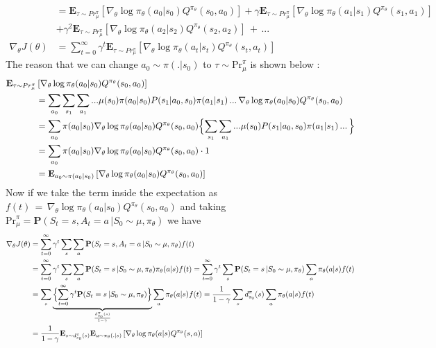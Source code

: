 {{\begin{align}
    & =\mathbf{E}_{\tau \sim Pr_\mu^\pi }\left[\nabla_\theta \log \pi_\theta(a_0|s_0)Q^{\pi_\theta}(s_0,a_0) \right] + \gamma \mathbf{E}_{\tau \sim Pr_\mu^\pi}\left[\nabla_\theta \log \pi_\theta(a_1|s_1)Q^{\pi_\theta}(s_1,a_1)\right] \nonumber \\&+ \gamma^2 \mathbf{E}_{\tau \sim Pr_\mu^\pi }\left[\nabla_\theta \log \pi_\theta(a_2|s_2)Q^{\pi_\theta}(s_2,a_2) \right]\,  + \, ... \nonumber\\
    \nabla_\theta J(\theta) &= \sum_{t=0}^{\infty} \gamma^t \mathbf{E}_{\tau \sim Pr_\mu^\pi }\left[\nabla_\theta \log \pi_\theta(a_t|s_t)Q^{\pi_\theta}(s_t,a_t) \right] \nonumber 
\end{align}
The reason that we can change $a_0 \sim \pi(.|s_0)$ to $\tau \sim \text{Pr}_{\mu}^{\pi}$ is shown below :
\begin{align}
    \mathbf{E}_{\tau \sim Pr_\mu^\pi } &\left[\nabla_\theta \log \pi_\theta(a_0|s_0)Q^{\pi_\theta}(s_0,a_0) \right] \nonumber \\
     &= \sum_{a_0}\sum_{s_1}\sum_{a_1} ... \mu(s_0)\pi(a_0|s_0)P(s_1|a_0,s_0)\pi(a_1|s_1)\, ...\,\nabla_\theta \log \pi_\theta(a_0|s_0)Q^{\pi_\theta}(s_0,a_0) \nonumber \\ 
    &= \sum_{a_0} \pi(a_0|s_0)\nabla_\theta \log \pi_\theta(a_0|s_0)Q^{\pi_\theta}(s_0,a_0) \Bigl\{ \sum_{s_1} \sum_{a_1} ...  \mu(s_0)P(s_1|a_0,s_0)\pi(a_1|s_1)\, ...\, \Bigl\} \nonumber \\
    & =\sum_{a_0} \pi(a_0|s_0)\nabla_\theta \log \pi_\theta(a_0|s_0)Q^{\pi_\theta}(s_0,a_0) \cdot 1 \nonumber \\
    & = \mathbf{E}_{a_0 \sim \pi(a_0|s_0)}\left[\nabla_\theta \log \pi_\theta(a_0|s_0)Q^{\pi_\theta}(s_0,a_0) \right] \nonumber
\end{align}
Now if we take the term inside the expectation as $f(t) \, = \, \nabla_\theta \log \pi_\theta(a_0|s_0)Q^{\pi_\theta}(s_0,a_0) $ and taking $\text{Pr}_{\mu}^{\pi} = \textbf{P}(S_t = s , A_t =a \, |S_0 \sim \mu , \pi_{\theta})$ we have
\begin{align}
    \nabla_\theta J(\theta) &=  \sum_{t=0}^{\infty} \gamma^t \sum_s \sum_a \textbf{P}(S_t = s , A_t =a \, |S_0 \sim \mu , \pi_{\theta}) f(t) \nonumber \\
    & =\sum_{t=0}^{\infty} \gamma^t \sum_s \sum_a \textbf{P}(S_t = s \, |S_0 \sim \mu , \pi_{\theta}) \pi_\theta (a|s) f(t) = \sum_{t=0}^{\infty} \gamma^t \sum_s \textbf{P}(S_t = s \, |S_0 \sim \mu , \pi_{\theta}) \sum_a  \pi_\theta (a|s) f(t) \nonumber \\
    & = \sum_s \underbrace{\Bigl\{ \sum_{t=0}^{\infty} \gamma^t \textbf{P}(S_t = s \, |S_0 \sim \mu , \pi_{\theta}) \Bigl\} }_{\frac{d_{s_0}^{\pi}(s)}{1-\gamma}}\sum_a  \pi_\theta (a|s) f(t)  = \frac{1}{1-\gamma} \sum_s d_{s_0}^{\pi}(s)\sum_a  \pi_\theta (a|s) f(t) \nonumber \\
    & = \frac{1}{1-\gamma} \mathbf{E}_{s \sim d_{s_0}^{\pi}(s)} \mathbf{E}_{a \sim \pi_\theta(.|s)}\left[ \nabla_\theta \log \pi_\theta(a|s)Q^{\pi_\theta}(s,a)\right] \nonumber
\end{align}
}}


